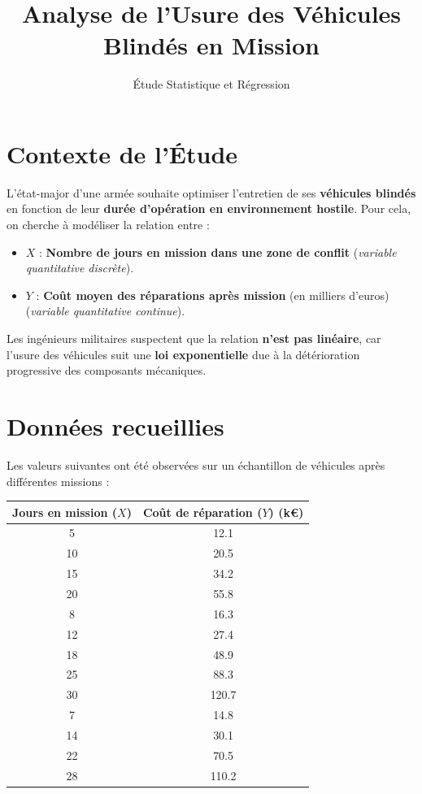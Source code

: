 \documentclass[a4paper,12pt]{article}
\title{Analyse de l'Usure des Véhicules Blindés en Mission}
\author{Étude Statistique et Régression}
\date{}
\begin{document}
\maketitle

\section{Contexte de l'Étude}

L'état-major d’une armée souhaite optimiser l’entretien de ses \textbf{véhicules blindés} en fonction de leur \textbf{durée d’opération en environnement hostile}. Pour cela, on cherche à modéliser la relation entre :

\begin{itemize}
    \item \( X \) : \textbf{Nombre de jours en mission dans une zone de conflit} (\textit{variable quantitative discrète}).
    \item \( Y \) : \textbf{Coût moyen des réparations après mission} (en milliers d’euros) (\textit{variable quantitative continue}).
\end{itemize}

Les ingénieurs militaires suspectent que la relation \textbf{n’est pas linéaire}, car l’usure des véhicules suit une \textbf{loi exponentielle} due à la détérioration progressive des composants mécaniques.

\section{Données recueillies}

Les valeurs suivantes ont été observées sur un échantillon de véhicules après différentes missions :

\begin{center}
    \begin{tabular}{c c}
        \toprule
        \textbf{Jours en mission (\( X \))} & \textbf{Coût de réparation (\( Y \)) (k€)} \\
        \midrule
        5  & 12.1 \\
        10 & 20.5 \\
        15 & 34.2 \\
        20 & 55.8 \\
        8  & 16.3 \\
        12 & 27.4 \\
        18 & 48.9 \\
        25 & 88.3 \\
        30 & 120.7 \\
        7  & 14.8 \\
        14 & 30.1 \\
        22 & 70.5 \\
        28 & 110.2 \\
        \bottomrule
    \end{tabular}
\end{center}
\end{document}
